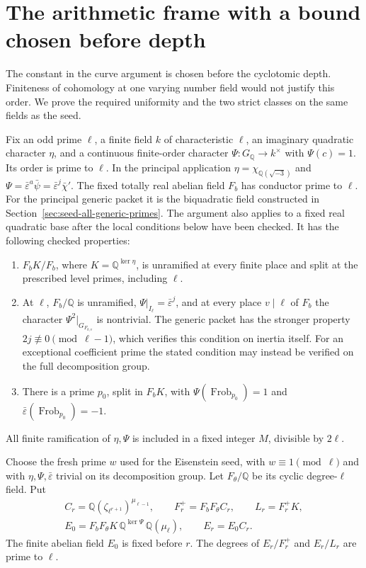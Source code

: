 \section{The arithmetic frame with a bound chosen before depth}
\label{sec:arithmetic-frame-uniform-depth}

The constant in the curve argument is chosen before the
cyclotomic depth.  Finiteness of cohomology at one varying
number field would not justify this order.
We prove the required uniformity and the two strict
classes on the same fields as the seed.

Fix an odd prime \(\ell\), a finite field \(k\) of
characteristic \(\ell\), an imaginary quadratic character
\(\eta\), and a continuous finite-order character
\(\Psi:G_{\mathbb Q}\to k^\times\) with \(\Psi(c)=1\).
Its order is prime to \(\ell\).
In the principal application
\(\eta=\chi_{\mathbb Q(\sqrt{-3})}\) and
\(\Psi=\bar\varepsilon^a\bar\psi
      =\bar\varepsilon^j\bar\chi'\).
The fixed totally real abelian field \(F_b\) has
conductor prime to \(\ell\).
For the principal generic packet it is the
biquadratic field constructed in
Section~\ref{sec:seed-all-generic-primes}.
The argument also applies to a fixed real quadratic
base after the local conditions below have been checked.
It has the following checked properties:
\begin{enumerate}
\item \(F_bK/F_b\), where \(K=\mathbb Q^{\ker\eta}\),
is unramified at every finite place and split at the
prescribed level primes, including \(\ell\).
\item At \(\ell\), \(F_b/\mathbb Q\) is unramified,
\(\Psi|_{I_\ell}=\bar\varepsilon^j\), and at every
place \(v\mid\ell\) of \(F_b\) the character
\(\Psi^2|_{G_{F_{b,v}}}\) is nontrivial.
The generic packet has the stronger property
\(2j\not\equiv0\pmod{\ell-1}\), which verifies this
condition on inertia itself.
For an exceptional coefficient prime the stated
condition may instead be verified on the full
decomposition group.
\item There is a prime \(p_0\), split in \(F_bK\), with
\(\Psi(\operatorname{Frob}_{p_0})=1\) and
\(\bar\varepsilon(\operatorname{Frob}_{p_0})=-1\).
\end{enumerate}
All finite ramification of \(\eta,\Psi\) is included in
a fixed integer \(M\), divisible by \(2\ell\).

Choose the fresh prime \(w\) used for the Eisenstein
seed, with \(w\equiv1\pmod{\ell}\) and with
\(\eta,\Psi,\bar\varepsilon\) trivial on its decomposition
group.  Let \(F_\theta/\mathbb Q\) be its cyclic
degree-\(\ell\) field.
Put
\[
 \begin{gathered}
 C_r=\mathbb Q(\zeta_{\ell^{r+1}})^{\mu_{\ell-1}},
 \qquad F_r^+=F_bF_\theta C_r,\qquad L_r=F_r^+K,\\
 E_0=F_bF_\theta K\,\mathbb Q^{\ker\Psi}\,
                                  \mathbb Q(\mu_\ell),
 \qquad E_r=E_0C_r.
 \end{gathered}                                             \tag{AF1}
\]
The finite abelian field \(E_0\) is fixed before \(r\).
The degrees of \(E_r/F_r^+\) and \(E_r/L_r\) are prime to
\(\ell\).

